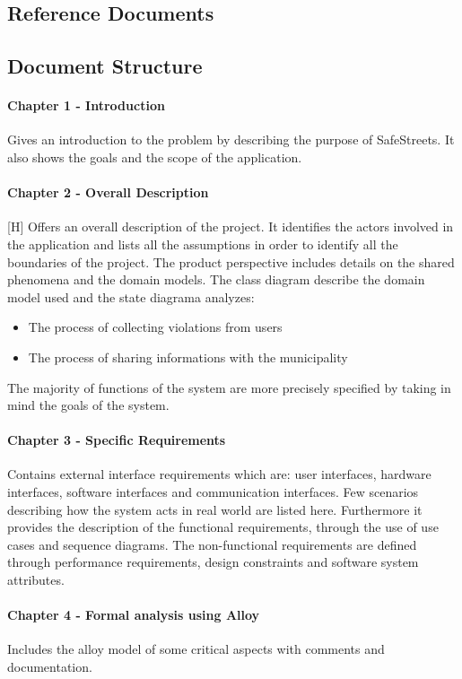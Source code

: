 \documentclass{article}
\begin{document}
\subsection{Reference Documents}
\subsection{Document Structure}
\paragraph{Chapter 1 - Introduction}
Gives an introduction to the problem by describing the purpose of SafeStreets.
It also shows the goals and the scope of the application. \paragraph{Chapter 2 -
Overall Description}[H] Offers an overall description of the project. It
identifies the actors involved in the application and lists all the assumptions
in order to identify all the boundaries of the project. The product perspective
includes details on the shared phenomena and the domain models. The class
diagram describe the domain model used and the state diagrama analyzes:
\begin{itemize}
    \item The process of collecting violations from users
    \item The process of sharing informations with the municipality
\end{itemize}
The majority of functions of the system are more precisely specified by taking
in mind the goals of the system.  
\paragraph{Chapter 3 - Specific Requirements}
Contains external interface requirements which are: user interfaces, hardware
interfaces, software interfaces and communication interfaces. Few scenarios
describing how the system acts in real world are listed here. Furthermore it
provides the description of the functional requirements, through the use of use
cases and sequence diagrams. The non-functional requirements are defined through
performance requirements, design constraints and software system attributes.
\paragraph{Chapter 4 - Formal analysis using Alloy}
Includes the alloy model of some critical aspects with comments and
documentation.
\end{document}
